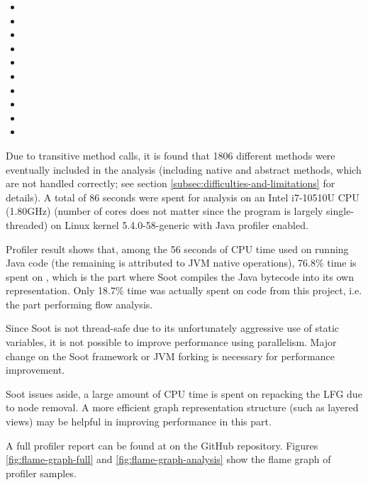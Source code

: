 \begin{itemize}
  \item {}
  \item {}
  \item {}
  \item {}
  \item {}
  \item {}
  \item {}
  \item {}
  \item {}
  \item {}
\end{itemize}

Due to transitive method calls,
it is found that 1806 different methods were eventually included in the analysis
(including native and abstract methods, which are not handled correctly;
see section \ref{subsec:difficulties-and-limitations} for details).
A total of 86 seconds were spent for analysis on an Intel i7-10510U CPU (1.80GHz)
(number of cores does not matter since the program is largely single-threaded)
on Linux kernel 5.4.0-58-generic with Java profiler enabled.

Profiler result shows that, among the 56 seconds of CPU time used on running Java code
(the remaining is attributed to JVM native operations),
76.8\% time is spent on ,
which is the part where Soot compiles the Java bytecode into its own representation.
Only 18.7\% time was actually spent on code from this project,
i.e. the part performing flow analysis.

Since Soot is not thread-safe due to its unfortunately aggressive use of static variables,
it is not possible to improve performance using parallelism.
Major change on the Soot framework or \ac{JVM} forking is necessary
for performance improvement.

Soot issues aside,
a large amount of CPU time is spent
on repacking the \ac{LFG} due to node removal.
A more efficient graph representation structure (such as layered views)
may be helpful in improving performance in this part.

A full profiler report can be found at  on the GitHub repository.
Figures \ref{fig:flame-graph-full} and \ref{fig:flame-graph-analysis}
show the flame graph of profiler samples.

